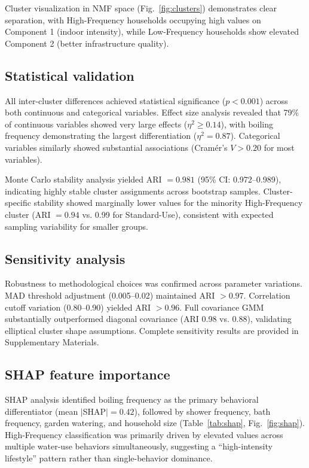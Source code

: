 \documentclass[a4paper,12pt]{article}
\begin{document}
Cluster visualization in NMF space (Fig.~\ref{fig:clusters}) demonstrates clear separation, with High-Frequency households occupying high values on Component 1 (indoor intensity), while Low-Frequency households show elevated Component 2 (better infrastructure quality).

\subsection{Statistical validation}

All inter-cluster differences achieved statistical significance ($p<0.001$) across both continuous and categorical variables. Effect size analysis revealed that 79\% of continuous variables showed very large effects ($\eta^2 \geq 0.14$), with boiling frequency demonstrating the largest differentiation ($\eta^2=0.87$). Categorical variables similarly showed substantial associations (Cram\'{e}r's $V > 0.20$ for most variables).

Monte Carlo stability analysis yielded ARI $= 0.981$ (95\% CI: 0.972--0.989), indicating highly stable cluster assignments across bootstrap samples. Cluster-specific stability showed marginally lower values for the minority High-Frequency cluster (ARI $= 0.94$ vs. 0.99 for Standard-Use), consistent with expected sampling variability for smaller groups.

\subsection{Sensitivity analysis}

Robustness to methodological choices was confirmed across parameter variations. MAD threshold adjustment (0.005--0.02) maintained ARI $> 0.97$. Correlation cutoff variation (0.80--0.90) yielded ARI $> 0.96$. Full covariance GMM substantially outperformed diagonal covariance (ARI 0.98 vs. 0.88), validating elliptical cluster shape assumptions. Complete sensitivity results are provided in Supplementary Materials.

\subsection{SHAP feature importance}

SHAP analysis identified boiling frequency as the primary behavioral differentiator (mean $|$SHAP$| = 0.42$), followed by shower frequency, bath frequency, garden watering, and household size (Table~\ref{tab:shap}, Fig.~\ref{fig:shap}). High-Frequency classification was primarily driven by elevated values across multiple water-use behaviors simultaneously, suggesting a ``high-intensity lifestyle'' pattern rather than single-behavior dominance.
\end{document}
